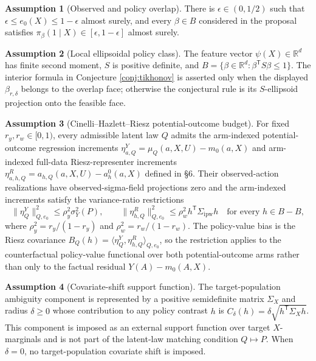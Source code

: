 \documentclass[11pt]{article}
\newcommand{\transpose}{\mathsf{T}}
\newcommand{\R}{\mathbb{R}}
\theoremstyle{definition}
\newtheorem{assumption}{Assumption}
\theoremstyle{plain}
\theoremstyle{remark}
\begin{document}
\begin{assumption}[Observed and policy overlap]\label{ass:overlap}
There is $\epsilon\in(0,1/2)$ such that $\epsilon\le e_0(X)\le1-\epsilon$ almost surely, and every $\beta\in B$ considered in the proposal satisfies $\pi_\beta(1\mid X)\in[\epsilon,1-\epsilon]$ almost surely.
\end{assumption}

\begin{assumption}[Local ellipsoidal policy class]\label{ass:policy-class}
The feature vector $\psi(X)\in\R^d$ has finite second moment, $S$ is positive definite, and $B=\{\beta\in\R^d:\beta^\transpose S\beta\le1\}$. The interior formula in Conjecture \ref{conj:tikhonov} is asserted only when the displayed $\beta_{r,\delta}$ belongs to the overlap face; otherwise the conjectural rule is its $S$-ellipsoid projection onto the feasible face.
\end{assumption}

\begin{assumption}[Cinelli--Hazlett--Riesz potential-outcome budget]\label{ass:ch-budget}
For fixed $r_y,r_w\in[0,1)$, every admissible latent law $Q$ admits the arm-indexed potential-outcome regression increments
$\eta^Y_{a,Q}=\mu_Q(a,X,U)-m_0(a,X)$ and arm-indexed full-data Riesz-representer increments
$\eta^R_{a,h,Q}=a_{h,Q}(a,X,U)-a^0_h(a,X)$ defined in \S6. Their observed-action realizations have observed-sigma-field projections zero and the arm-indexed increments satisfy the variance-ratio restrictions
\[
  \|\eta^Y_Q\|_{Q,e_0}^2\le \rho_y^2\sigma_Y^2(P),
  \qquad
  \|\eta^R_{h,Q}\|_{Q,e_0}^2\le \rho_w^2 h^\transpose\Sigma_{\mathrm{ipw}}h
  \quad\text{for every } h\in B-B,
\]
where $\rho_y^2=r_y/(1-r_y)$ and $\rho_w^2=r_w/(1-r_w)$. The policy-value bias is the Riesz covariance
$B_Q(h)=\langle\eta^Y_Q,\eta^R_{h,Q}\rangle_{Q,e_0}$, so the restriction applies to the counterfactual policy-value functional over both potential-outcome arms rather than only to the factual residual $Y(A)-m_0(A,X)$.
\end{assumption}

\begin{assumption}[Covariate-shift support function]\label{ass:cov-shift}
The target-population ambiguity component is represented by a positive semidefinite matrix $\Sigma_X$ and radius $\delta\ge0$ whose contribution to any policy contrast $h$ is
$C_\delta(h)=\delta\sqrt{h^\transpose\Sigma_Xh}$. This component is imposed as an external support function over target $X$-marginals and is not part of the latent-law matching condition $Q\mapsto P$. When $\delta=0$, no target-population covariate shift is imposed.
\end{assumption}
\end{document}
